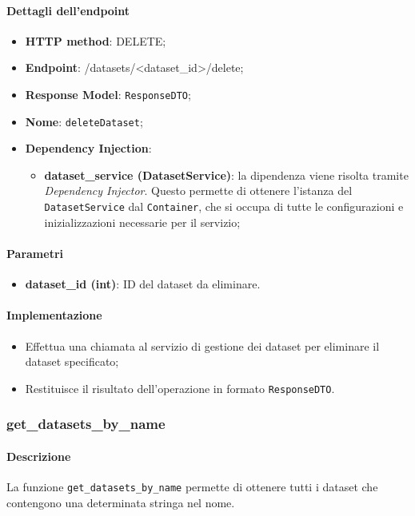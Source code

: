 \paragraph{Dettagli dell'endpoint}
\begin{itemize}
    \item \textbf{HTTP method}: DELETE;
    \item \textbf{Endpoint}: /datasets/\textless dataset\_id\textgreater/delete;
    \item \textbf{Response Model}: \texttt{ResponseDTO};
    \item \textbf{Nome}: \texttt{deleteDataset};
    \item \textbf{Dependency Injection}: 
    \begin{itemize}
        \item \textbf{dataset\_service (DatasetService)}: la dipendenza viene risolta tramite \textit{Dependency Injector}. Questo permette di ottenere l'istanza del \texttt{DatasetService} dal \texttt{Container}, che si occupa di tutte le configurazioni e inizializzazioni necessarie per il servizio;
    \end{itemize}
\end{itemize}

\paragraph{Parametri}
\begin{itemize}
    \item \textbf{dataset\_id (int)}: ID del dataset da eliminare.
\end{itemize}

\paragraph{Implementazione}
\begin{itemize}
    \item Effettua una chiamata al servizio di gestione dei dataset per eliminare il dataset specificato;
    \item Restituisce il risultato dell'operazione in formato \texttt{ResponseDTO}.
\end{itemize}

\subsubsection{get\_datasets\_by\_name}
\paragraph{Descrizione}
La funzione \texttt{get\_datasets\_by\_name} permette di ottenere tutti i dataset che contengono una determinata stringa nel nome.
